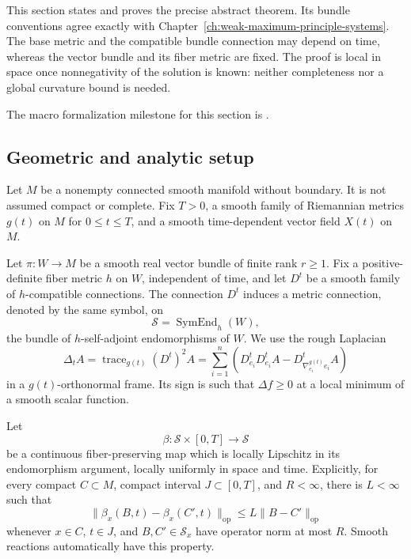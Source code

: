 \documentclass[10pt]{coll-l}
\newcommand{\trace}{\operatorname{trace}}
\newcommand{\nodeid}[1]{{\scriptsize\ttfamily
  \StrSubstitute{#1}{-}{-\allowbreak}}}
\theoremstyle{definition}
\theoremstyle{remark}
\numberwithin{section}{chapter}
\numberwithin{equation}{chapter}
\begin{document}
This section states and proves the precise abstract theorem.  Its bundle
conventions agree exactly with Chapter~\ref{ch:weak-maximum-principle-systems}.
The base metric and the compatible bundle connection may depend on time,
whereas the vector bundle and its fiber metric are fixed.  The proof is
local in space once nonnegativity of the solution is known: neither
completeness nor a global curvature bound is needed.

The macro formalization milestone for this section is
\nodeid{PC-M-STRONG-MAXIMUM-PRINCIPLE-SYSTEMS}.

\subsection{Geometric and analytic setup}
\label{subsec:smp-setup}

Let $M$ be a nonempty connected smooth manifold without boundary.  It is
not assumed compact or complete.  Fix $T>0$, a smooth family of Riemannian metrics
$g(t)$ on $M$ for $0\leq t\leq T$, and a smooth time-dependent vector field
$X(t)$ on $M$.

Let $\pi:W\to M$ be a smooth real vector bundle of finite rank $r\geq1$.
Fix a positive-definite fiber metric $h$ on $W$, independent of time, and
let $D^t$ be a smooth family of $h$-compatible connections.  The connection
$D^t$ induces a metric connection, denoted by the same symbol, on
\[
              \mathcal S=\operatorname{SymEnd}_h(W),
\]
the bundle of $h$-self-adjoint endomorphisms of $W$.  We use the rough
Laplacian
\[
 \Delta_t A
 =\trace_{g(t)}(D^t)^2A
 =\sum_{i=1}^{n}
   \left(D^t_{e_i}D^t_{e_i}A
        -D^t_{\nabla^{g(t)}_{e_i}e_i}A\right)
\]
in a $g(t)$-orthonormal frame.  Its sign is such that $\Delta f\geq0$ at a
local minimum of a smooth scalar function.

Let
\[
 \beta:\mathcal S\times[0,T]\longrightarrow\mathcal S
\]
be a continuous fiber-preserving map which is locally Lipschitz in its
endomorphism argument, locally uniformly in space and time.  Explicitly,
for every compact $C\subset M$, compact interval $J\subset[0,T]$, and
$R<\infty$, there is $L<\infty$ such that
\begin{equation}
 \|\beta_x(B,t)-\beta_x(C',t)\|_{\mathrm{op}}
 \leq L\|B-C'\|_{\mathrm{op}}                         \label{eq:smp-local-lipschitz}
\end{equation}
whenever $x\in C$, $t\in J$, and $B,C'\in\mathcal S_x$ have operator norm
at most $R$.  Smooth reactions automatically have this property.
\end{document}
